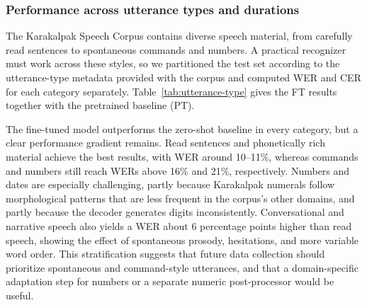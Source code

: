 \documentclass[11pt]{article}
\begin{document}
\subsubsection{Performance across utterance types and durations}

The Karakalpak Speech Corpus contains diverse speech material, from carefully read sentences to spontaneous commands and numbers. A practical recognizer must work across these styles, so we partitioned the test set according to the utterance-type metadata provided with the corpus and computed WER and CER for each category separately. Table~\ref{tab:utterance-type} gives the FT results together with the pretrained baseline (PT).

\begin{table}[H]
\centering
\caption{WER and CER stratified by utterance type for the pretrained (PT) and fully fine-tuned (FT) Large-v2 models. Duration refers to total test-set duration in that category.}
\label{tab:utterance-type}
\end{table}

The fine-tuned model outperforms the zero-shot baseline in every category, but a clear performance gradient remains. Read sentences and phonetically rich material achieve the best results, with WER around 10--11\%, whereas commands and numbers still reach WERs above 16\% and 21\%, respectively. Numbers and dates are especially challenging, partly because Karakalpak numerals follow morphological patterns that are less frequent in the corpus's other domains, and partly because the decoder generates digits inconsistently. Conversational and narrative speech also yields a WER about 6 percentage points higher than read speech, showing the effect of spontaneous prosody, hesitations, and more variable word order. This stratification suggests that future data collection should prioritize spontaneous and command-style utterances, and that a domain-specific adaptation step for numbers or a separate numeric post-processor would be useful.
\end{document}
